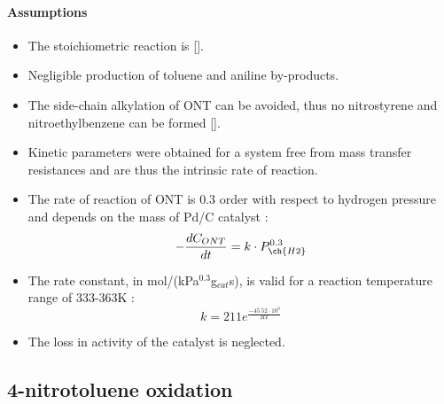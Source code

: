 \paragraph{Assumptions}
\begin{itemize}
    \item The stoichiometric reaction is  [].
    \item Negligible production of toluene and aniline by-products.  
    \item The side-chain alkylation of ONT can be avoided, thus no nitrostyrene and nitroethylbenzene can be formed [].
    \item Kinetic parameters were obtained for a system free from mass transfer resistances and are thus the intrinsic rate of reaction.
    \item The rate of reaction of ONT is 0.3 order with respect to hydrogen pressure and depends on the mass of Pd/C catalyst \cite{rajadhyaksha_solvent_1986}:
    \begin{equation}
    - \frac{dC_{ONT}}{dt}=k \cdot P_{\ch{H2}}^{0.3} 
    \end{equation}
    \item The rate constant, in mol/(kPa$^{0.3}$g$_{cat}$s), is valid for a reaction temperature range of 333-363K \cite{rajadhyaksha_solvent_1986}:
    \begin{equation}
        k=211e^{\frac{-45.52\cdot 10^{3}}{RT}}
    \end{equation}
    \item The loss in activity of the catalyst is neglected.
\end{itemize}

\subsection{4-nitrotoluene oxidation}
